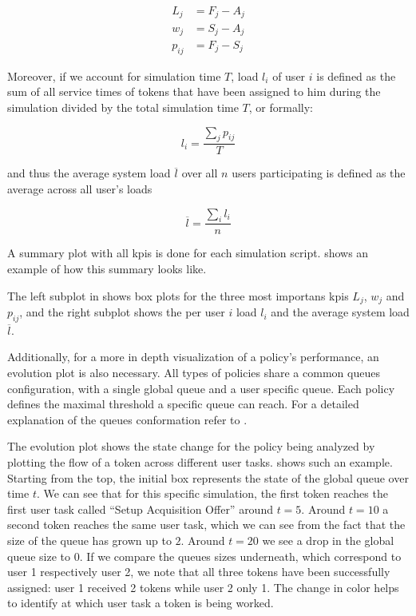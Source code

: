 \begin{align}
	L_j&=F_j-A_j \label{eq:lateness}\\
	w_j&=S_j-A_j \\
	p_{ij}&=F_j-S_j
\end{align}

Moreover, if we account for simulation time $T$, load $l_i$ of user $i$ is defined as the sum of all service times of tokens that have been assigned to him during the simulation divided by the total simulation time $T$, or formally:

\begin{equation}
	l_i=\frac{\sum_j p_{ij}}{T}
\end{equation}

and thus the average system load $\overline{l}$ over all $n$ users participating is defined as the average across all user's loads \ie

\begin{equation}
	\overline{l} = \frac{\sum_i l_i}{n}
\end{equation}

A summary plot with all \glspl{kpi} is done for each simulation script.  shows an example of how this summary looks like.


The left subplot in  shows box plots for the three most importans \glspl{kpi} \ie $L_j$, $w_j$ and $p_{ij}$, and the right subplot shows the per user $i$ load $l_i$ and the average system load $\overline{l}$.

Additionally, for a more in depth visualization of a policy's performance, an evolution plot is also necessary. All types of policies share a common queues configuration, with a single global queue and a user specific queue. Each policy defines the maximal threshold a specific queue can reach. For a detailed explanation of the queues conformation refer to .

The evolution plot shows the state change for the policy being analyzed by plotting the flow of a token across different user tasks.  shows such an example. Starting from the top, the initial box represents the state of the global queue over time $t$. We can see that for this specific simulation, the first token reaches the first user task called ``Setup Acquisition Offer'' around $t=5$. Around $t=10$ a second token reaches the same user task, which we can see from the fact that the size of the queue has grown up to $2$. Around $t=20$ we see a drop in the global queue size to $0$. If we compare the queues sizes underneath, which correspond to user 1 respectively user 2, we note that all three tokens have been successfully assigned: user 1 received 2 tokens while user 2 only 1. The change in color helps to identify at which user task a token is being worked.

